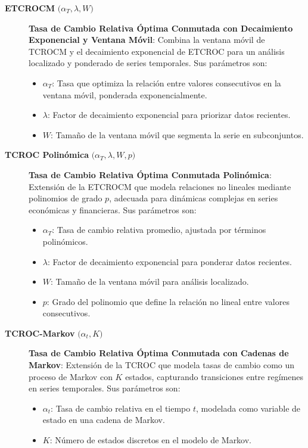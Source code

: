 \begin{description}
\item[\textbf{ETCROCM} \(\bigl(\alpha_T, \lambda, W\bigr)\)] 
\textbf{Tasa de Cambio Relativa Óptima Conmutada con Decaimiento Exponencial y Ventana Móvil}:  
Combina la ventana móvil de TCROCM y el decaimiento exponencial de ETCROC para un análisis localizado y ponderado de series temporales. Sus parámetros son:
\begin{itemize}
  \item \(\alpha_T\): Tasa que optimiza la relación entre valores consecutivos en la ventana móvil, ponderada exponencialmente.
  \item \(\lambda\): Factor de decaimiento exponencial para priorizar datos recientes.
  \item \(W\): Tamaño de la ventana móvil que segmenta la serie en subconjuntos.
\end{itemize}

\item[\textbf{TCROC Polinómica} \(\bigl(\alpha_T, \lambda, W, p\bigr)\)] 
\textbf{Tasa de Cambio Relativa Óptima Conmutada Polinómica}:  
Extensión de la ETCROCM que modela relaciones no lineales mediante polinomios de grado \(p\), adecuada para dinámicas complejas en series económicas y financieras. Sus parámetros son:
\begin{itemize}
  \item \(\alpha_T\): Tasa de cambio relativa promedio, ajustada por términos polinómicos.
  \item \(\lambda\): Factor de decaimiento exponencial para ponderar datos recientes.
  \item \(W\): Tamaño de la ventana móvil para análisis localizado.
  \item \(p\): Grado del polinomio que define la relación no lineal entre valores consecutivos.
\end{itemize}

\item[\textbf{TCROC-Markov} \(\bigl(\alpha_t, K\bigr)\)] 
\textbf{Tasa de Cambio Relativa Óptima Conmutada con Cadenas de Markov}:  
Extensión de la TCROC que modela tasas de cambio como un proceso de Markov con \(K\) estados, capturando transiciones entre regímenes en series temporales. Sus parámetros son:
\begin{itemize}
  \item \(\alpha_t\): Tasa de cambio relativa en el tiempo \(t\), modelada como variable de estado en una cadena de Markov.
  \item \(K\): Número de estados discretos en el modelo de Markov.
\end{itemize}


\end{description}
